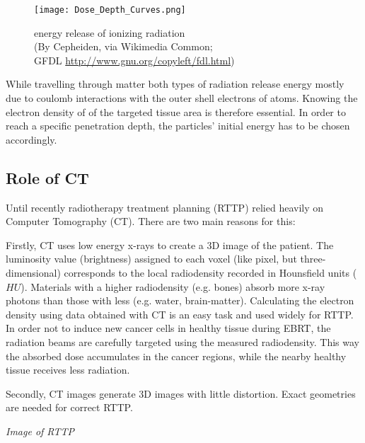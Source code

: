\begin{figure}[!h]
	\centering
	\texttt{[image: Dose\_Depth\_Curves.png]}
	\caption{energy release of ionizing radiation \\(By Cepheiden, via Wikimedia Common;\\ GFDL \url{http://www.gnu.org/copyleft/fdl.html})}
	\label{fig:bragg}
\end{figure}

While travelling through matter both types of radiation release energy mostly due to coulomb interactions with the outer shell electrons of atoms.
Knowing the electron density of of the targeted tissue area is therefore essential. In order to reach a specific penetration depth, the particles' initial energy has to be chosen accordingly.

\clearpage
\subsection{Role of CT}

Until recently radiotherapy treatment planning (RTTP) relied heavily on Computer Tomography (CT). There are two main reasons for this:

Firstly, CT uses low energy x-rays to create a 3D image of the patient. The luminosity value (brightness) assigned to each voxel (like pixel, but three-dimensional) corresponds to
the local radiodensity recorded in Hounsfield units ($HU$). Materials with a higher radiodensity (e.g. bones) absorb more x-ray photons than those with less (e.g. water, brain-matter).
Calculating the electron density using data obtained with CT is an easy task and used widely for RTTP. \cite{Constantinou2012, Schneider1996}
In order not to induce new cancer cells in healthy tissue during EBRT, the radiation beams are carefully targeted using the measured radiodensity. 
This way the absorbed dose accumulates in the cancer regions, while the nearby healthy tissue receives less radiation.

Secondly, CT images generate 3D images with little distortion. Exact geometries are needed for correct RTTP. %

\vspace{4cm}
\textit{Image of RTTP}
\vspace{2cm}

